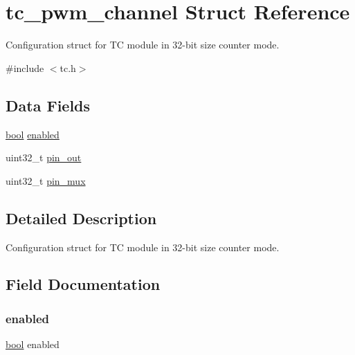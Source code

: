 \hypertarget{structtc__pwm__channel}{}\section{tc\+\_\+pwm\+\_\+channel Struct Reference}
\label{structtc__pwm__channel}


Configuration struct for TC module in 32-\/bit size counter mode.  




{\ttfamily \#include $<$tc.\+h$>$}

\subsection*{Data Fields}
\begin{DoxyCompactItemize}
\item 
\mbox{\hyperlink{group__group__sam0__utils_ga97a80ca1602ebf2303258971a2c938e2}{bool}} \mbox{\hyperlink{structtc__pwm__channel_a8740ba80e30dd75e71d09fa1dcf04f3d}{enabled}}
\item 
uint32\+\_\+t \mbox{\hyperlink{structtc__pwm__channel_a7a9c8f94c82e4bd69070967a347f1494}{pin\+\_\+out}}
\item 
uint32\+\_\+t \mbox{\hyperlink{structtc__pwm__channel_abd435c343973692ed38c21f0a4680243}{pin\+\_\+mux}}
\end{DoxyCompactItemize}


\subsection{Detailed Description}
Configuration struct for TC module in 32-\/bit size counter mode. 

\subsection{Field Documentation}
\mbox{\label{structtc__pwm__channel_a8740ba80e30dd75e71d09fa1dcf04f3d}} 
\subsubsection{\texorpdfstring{enabled}{enabled}}
{\footnotesize\ttfamily \mbox{\hyperlink{group__group__sam0__utils_ga97a80ca1602ebf2303258971a2c938e2}{bool}} enabled}

